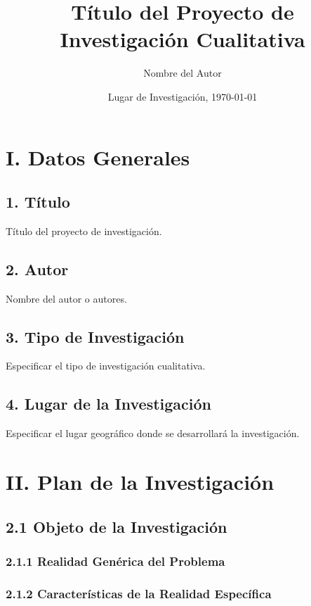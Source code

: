 \documentclass[12pt]{../componentes/uns}
\title{Título del Proyecto de Investigación Cualitativa}
\author{Nombre del Autor}
\date{Lugar de Investigación, \today}
\begin{document}
\maketitle


\newpage
\tableofcontents
\newpage


\section*{I. Datos Generales}

\subsection*{1. Título}
Título del proyecto de investigación.

\subsection*{2. Autor}
Nombre del autor o autores.

\subsection*{3. Tipo de Investigación}
Especificar el tipo de investigación cualitativa.

\subsection*{4. Lugar de la Investigación}
Especificar el lugar geográfico donde se desarrollará la investigación.

\section*{II. Plan de la Investigación}

\subsection*{2.1 Objeto de la Investigación}
\subsubsection*{2.1.1 Realidad Genérica del Problema}
\lipsum[1] %

\subsubsection*{2.1.2 Características de la Realidad Específica}
\lipsum[2] %
\end{document}
